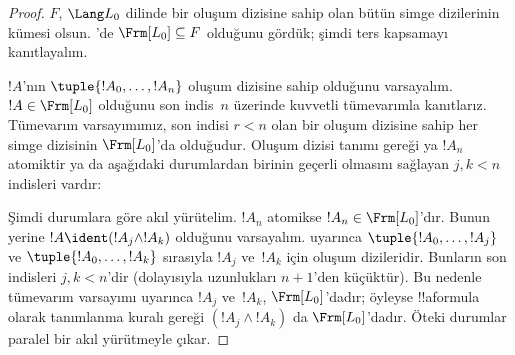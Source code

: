 \begin{proof}
$F$, $\Lang L_0$ dilinde bir oluşum dizisine sahip olan bütün simge
dizilerinin kümesi olsun. 'de
$\Frm[L_0] \subseteq F$ olduğunu gördük; şimdi ters kapsamayı kanıtlayalım.

$!A$'nın $\tuple{!A_0,\dotsc,!A_n}$ oluşum dizisine sahip olduğunu
varsayalım. $!A \in \Frm[L_0]$ olduğunu son indis~$n$ üzerinde kuvvetli
tümevarımla kanıtlarız. Tümevarım varsayımımız, son indisi $r<n$ olan bir
oluşum dizisine sahip her simge dizisinin $\Frm[L_0]$'da olduğudur. Oluşum
dizisi tanımı gereği ya $!A_n$ atomiktir ya da aşağıdaki durumlardan birinin
geçerli olmasını sağlayan $j,k < n$ indisleri vardır:
\begin{enumerate}
\end{enumerate}
Şimdi durumlara göre akıl yürütelim. $!A_n$ atomikse
$!A_n \in \Frm[L_0]$'dır. Bunun yerine $!A \ident
(!A_j \land !A_k)$ olduğunu varsayalım.
 uyarınca
$\tuple{!A_0,\dotsc,!A_j}$ ve $\tuple{!A_0,\dotsc,!A_k}$ sırasıyla $!A_j$
ve~$!A_k$ için oluşum dizileridir. Bunların son indisleri $j,k<n$'dir
(dolayısıyla uzunlukları $n+1$'den küçüktür). Bu nedenle tümevarım varsayımı
uyarınca $!A_j$ ve~$!A_k$, $\Frm[L_0]$'dadır; öyleyse !!a{formula} olarak tanımlanma kuralı
gereği $(!A_j \land !A_k)$ da $\Frm[L_0]$'dadır. Öteki durumlar paralel bir
akıl yürütmeyle çıkar.
\end{proof}

